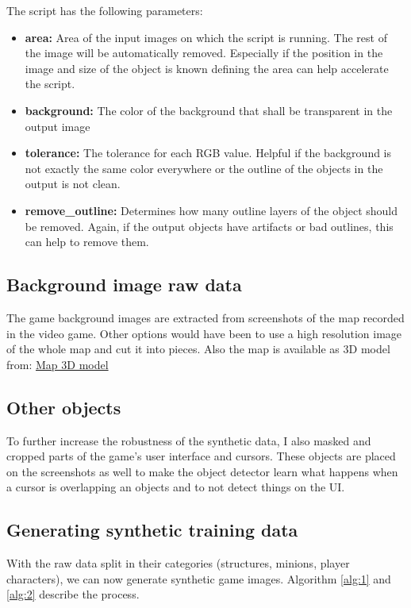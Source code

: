 The script has the following parameters:
\begin{itemize}
\item \textbf{area:} Area of the input images on which the script is running. The rest of the image will be automatically removed. Especially if the position in the image and size of the object is known defining the area can help accelerate the script.
\item \textbf{background:} The color of the background that shall be transparent in the output image
\item \textbf{tolerance:} The tolerance for each RGB value. Helpful if the background is not exactly the same color everywhere or the outline of the objects in the output is not clean.
\item \textbf{remove\_outline:} Determines how many outline layers of the object should be removed.
Again, if the output objects have artifacts or bad outlines, this can help to remove them.
\end{itemize}

\subsection{Background image raw data}
The game background images are extracted from screenshots of the map recorded in the video game.
Other options would have been to use a high resolution image of the whole map and cut it into pieces.
Also the map is available as 3D model from: \href{https://sketchfab.com/3d-models/for-study-only-summoner-rift-3d-export-ac0a9c6676e34d1ebb184d8e93443c77}{Map 3D model}

\subsection{Other objects}
To further increase the robustness of the synthetic data, I also masked and cropped parts of the game's user interface and cursors.
These objects are placed on the screenshots as well to make the object detector learn what happens when a cursor is overlapping an objects and to not detect things on the UI.

\subsection{Generating synthetic training data}
With the raw data split in their categories (structures, minions, player characters), we can now generate synthetic game images.
Algorithm \ref{alg:1} and \ref{alg:2} describe the process.

